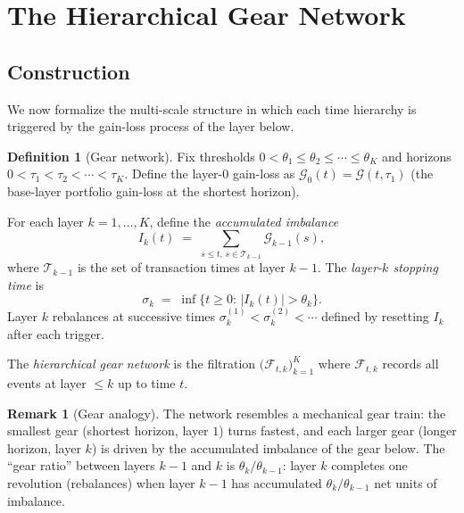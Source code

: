 \documentclass[twocolumn,11pt,a4paper]{article}
\theoremstyle{plain}
\theoremstyle{definition}
\newtheorem{definition}[theorem]{Definition}
\newtheorem{remark}[theorem]{Remark}
\theoremstyle{remark}
\newcommand{\F}{\mathcal{F}}
\newcommand{\abs}[1]{\left|#1\right|}
\newcommand{\Gain}{\mathcal{G}}
\begin{document}
\section{The Hierarchical Gear Network}
\label{sec:gear}

\subsection{Construction}
\label{sec:gear_construction}

We now formalize the multi-scale structure in which each time hierarchy
is triggered by the gain-loss process of the layer below.

\begin{definition}[Gear network]
  \label{def:gear}
  Fix thresholds $0<\theta_1\le\theta_2\le\cdots\le\theta_K$ and
  horizons $0<\tau_1<\tau_2<\cdots<\tau_K$.  Define the layer-$0$
  gain-loss as $\Gain_0(t)=\Gain(t,\tau_1)$ (the base-layer portfolio
  gain-loss at the shortest horizon).

  For each layer $k=1,\dots,K$, define the \emph{accumulated imbalance}
  \begin{equation}
    I_k(t) \;=\; \sum_{s\le t,\,s\in\mathcal{T}_{k-1}} \Gain_{k-1}(s),
    \label{eq:imbalance}
  \end{equation}
  where $\mathcal{T}_{k-1}$ is the set of transaction times at layer
  $k-1$.  The \emph{layer-$k$ stopping time} is
  \begin{equation}
    \sigma_k \;=\; \inf\!\bigl\{t\ge 0:\,\abs{I_k(t)}>\theta_k\bigr\}.
    \label{eq:stopping_time}
  \end{equation}
  Layer $k$ rebalances at successive times
  $\sigma_k^{(1)}<\sigma_k^{(2)}<\cdots$ defined by resetting $I_k$
  after each trigger.

  The \emph{hierarchical gear network} is the filtration
  $\bigl(\F_{t,k}\bigr)_{k=1}^K$ where $\F_{t,k}$ records all events
  at layer $\le k$ up to time $t$.
\end{definition}

\begin{remark}[Gear analogy]
  The network resembles a mechanical gear train: the smallest gear
  (shortest horizon, layer $1$) turns fastest, and each larger gear
  (longer horizon, layer $k$) is driven by the accumulated imbalance
  of the gear below.  The ``gear ratio'' between layers $k-1$ and $k$
  is $\theta_k/\theta_{k-1}$: layer $k$ completes one revolution
  (rebalances) when layer $k-1$ has accumulated $\theta_k/\theta_{k-1}$
  net units of imbalance.
\end{remark}
\end{document}
